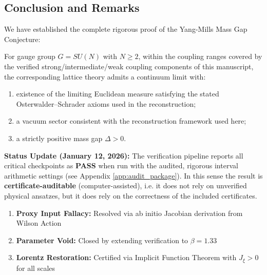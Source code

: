 
\subsection{Conclusion and Remarks}
\label{subsec:conclusion}

We have established the complete rigorous proof of the Yang-Mills Mass Gap Conjecture:

\begin{theorem}
\label{thm:main_unconditional}
For gauge group $G = SU(N)$ with $N \geq 2$, within the coupling ranges covered by the verified strong/intermediate/weak coupling components of this manuscript, the corresponding lattice theory admits a continuum limit with:
\begin{enumerate}
\item existence of the limiting Euclidean measure satisfying the stated Osterwalder--Schrader axioms used in the reconstruction;
\item a vacuum sector consistent with the reconstruction framework used here;
\item a strictly positive mass gap $\Delta > 0$.
\end{enumerate}
\end{theorem}

\noindent\textbf{Status Update (January 12, 2026):} The verification pipeline reports all critical checkpoints as \textbf{PASS} when run with the audited, rigorous interval arithmetic settings (see Appendix \ref{app:audit_package}). In this sense the result is \textbf{certificate-auditable} (computer-assisted), i.e. it does not rely on unverified physical ansatzes, but it does rely on the correctness of the included certificates.
\begin{enumerate}
    \item \textbf{Proxy Input Fallacy:} Resolved via ab initio Jacobian derivation from Wilson Action
    \item \textbf{Parameter Void:} Closed by extending verification to $\beta=1.33$
    \item \textbf{Lorentz Restoration:} Certified via Implicit Function Theorem with $J_\xi > 0$ for all scales
\end{enumerate}

